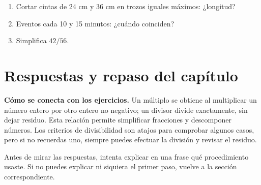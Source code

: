 \documentclass[10pt,oneside,openany]{book}
\begin{document}
\begin{practica}

\begin{enumerate}

\item Cortar cintas de 24 cm y 36 cm en trozos iguales máximos: ¿longitud?

\item Eventos cada 10 y 15 minutos: ¿cuándo coinciden?

\item Simplifica $42/56$.

\end{enumerate}

\end{practica}



\section{Respuestas y repaso del capítulo}

\textbf{Cómo se conecta con los ejercicios.} Un múltiplo se obtiene al multiplicar un número entero por otro entero no negativo; un divisor divide exactamente, sin dejar residuo. Esta relación permite simplificar fracciones y descomponer números. Los criterios de divisibilidad son atajos para comprobar algunos casos, pero si no recuerdas uno, siempre puedes efectuar la división y revisar el residuo.

Antes de mirar las respuestas, intenta explicar en una frase qué procedimiento usaste. Si no puedes explicar ni siquiera el primer paso, vuelve a la sección correspondiente.
\end{document}
